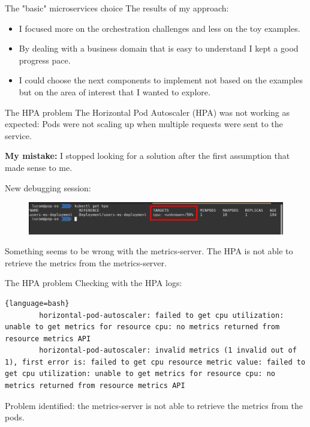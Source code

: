 \documentclass{beamer}
\begin{document}
\begin{frame}{The "basic" microservices choice}
	The results of my approach:
	\begin{itemize}
		\item I focused more on the orchestration challenges and less on the toy examples.
		\item By dealing with a business domain that is easy to understand I kept a good progress pace.
		\item I could choose the next components to implement not based on the examples but on the area of interest that I wanted to explore.
	\end{itemize}
\end{frame}

\begin{frame}{The HPA problem}
The Horizontal Pod Autoscaler (HPA) was not working as expected: Pods were not scaling up when multiple requests were sent to the service.
\begin{block}{}
	\textbf{My mistake:} I stopped looking for a solution after the first assumption that made sense to me.
\end{block}
New debugging session:
\begin{figure}
	\centering
	\includegraphics[width=1\linewidth]{./images/hpaProblem.png}
\end{figure}
Something seems to be wrong with the metrics-server. The HPA is not able to retrieve the metrics from the metrics-server.
\end{frame}

\begin{frame}[fragile]{The HPA problem}
Checking with the HPA logs:
	\begin{lstlisting}{language=bash}
		horizontal-pod-autoscaler: failed to get cpu utilization: unable to get metrics for resource cpu: no metrics returned from resource metrics API
		horizontal-pod-autoscaler: invalid metrics (1 invalid out of 1), first error is: failed to get cpu resource metric value: failed to get cpu utilization: unable to get metrics for resource cpu: no metrics returned from resource metrics API
	\end{lstlisting}

	\begin{block}{}
		Problem identified: the metrics-server is not able to retrieve the metrics from the pods.
	\end{block}
\end{frame}
\end{document}
